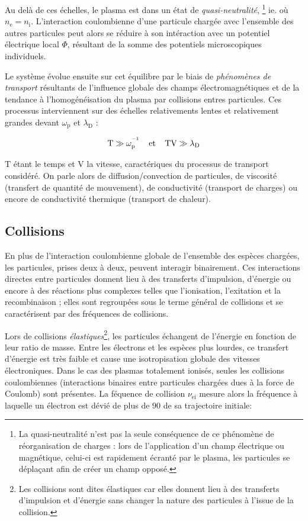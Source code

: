 Au delà de ces échelles, le plasma est dans un état de \emph{quasi-neutralité},
\footnote{La quasi-neutralité n'est pas la seule conséquence de ce phénomène de réorganisation
de charges : lors de l'application d'un champ électrique ou magnétique, celui-ci est rapidement
écranté par le plasma, les particules se
déplaçant afin de créer un champ opposé.} 
ie. où $n_\text{e}=n_\text{i}$.
L'interaction coulombienne d'une particule chargée avec l'ensemble des autres particules peut alors
se réduire à son intéraction avec un potentiel électrique local $\Phi$,
résultant de la somme des potentiels microscopiques individuels.

Le système évolue ensuite sur cet équilibre par le biais de
\emph{phénomènes de transport} résultants de l'influence
globale des champs électromagnétiques et de la tendance à
l'homogénéisation du plasma par collisions entres particules.
Ces processus interviennent sur des échelles relativements
lentes et relativement grandes devant $\omega_\text{p}$ et $\lambda_\text{D}$ :

\begin{equation}
\text{T}\gg \omega_\text{p}^{^{-1}}
\;\;\;\;\text{et}\;\;\;\;\text{TV}\gg\lambda_\text{D}
\end{equation}

$\text{T}$ étant le temps et $\text{V} $ la vitesse, caractériques du processus
de transport considéré.
On parle alors de diffusion/convection de particules, de viscosité (transfert de
quantité de mouvement), de conductivité (transport de charges) ou encore de
conductivité thermique (transport de chaleur).

\subsection{Collisions}
En plus de l'interaction coulombienne globale de l'ensemble des espèces chargées, 
les particules, prises deux à deux, peuvent interagir binairement. 
Ces interactions directes entre particules donnent lieu à des transferts
d'impulsion, d'énergie ou encore à des réactions plus complexes telles que
l'ionisation, l'exitation et la recombinaison ; elles sont regroupées
sous le terme général de collisions et se caractérisent par des fréquences de
collisions.

Lors de collisions \emph{élastiques}\footnote{Les collisions sont dites élastiques car
elles donnent lieu à des transferts d'impulsion et d'énergie sans changer
la nature des particules à l'issue de la collision.}, les particules échangent de l'énergie 
en fonction de leur ratio de masse. Entre les électrons et les espèces plus
lourdes, ce transfert d'énergie est très faible et cause une isotropisation
globale des vitesses électroniques.
Dans le cas des plasmas totalement ionisés, seules les collisions coulombiennes 
(interactions binaires entre particules chargées dues à la force de Coulomb)
sont présentes. 
La féquence de collision $\nu_\text{ei}$ mesure alors la fréquence à laquelle un
électron est dévié de plus de \unit{90}{\degree} de sa trajectoire initiale:

